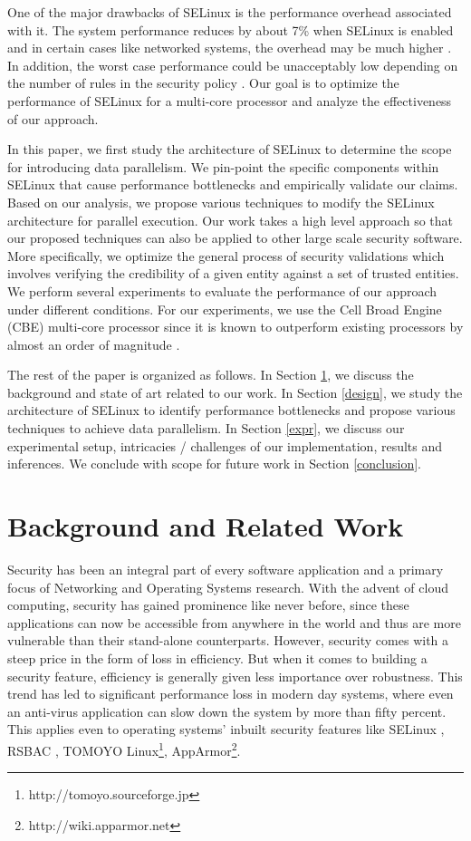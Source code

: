 \documentclass[conference]{IEEEtran}
\begin{document}
One of the major drawbacks of SELinux is the performance overhead associated with it. The system performance reduces by about 7\% when SELinux is enabled and in certain cases like networked systems, the
overhead may be much higher \cite{selinuxFAQ}. In addition, the worst
case performance could be unacceptably low depending on the number of
rules in the security policy \cite{report}. Our goal is to optimize the performance of SELinux for a multi-core processor and analyze the effectiveness of our approach.

In this paper, we first study the architecture of SELinux to determine
the scope for introducing data parallelism. We pin-point
the specific components within SELinux that cause performance
bottlenecks and empirically validate our claims. Based on our analysis, we propose various techniques
to modify the SELinux architecture for parallel
execution. Our work takes a high level approach so that our proposed techniques can also be applied to other large scale security software. More specifically, we optimize the general process of security validations which involves verifying the credibility of a given entity against a set of trusted entities. We
perform several experiments to evaluate the performance of our approach under different conditions. For our experiments, we use the Cell Broad Engine (CBE) multi-core processor since it is
known to outperform existing processors by almost an order of magnitude \cite{CBEArch}. 

The rest of the paper is organized as follows. In Section \ref{background}, we discuss the background and state of art related to our work. In Section \ref{design}, we
study the architecture of SELinux to identify performance bottlenecks and propose various techniques to
achieve data parallelism. In Section \ref{expr}, we discuss our experimental setup, intricacies / challenges of our implementation, results and inferences. We conclude with scope for future work in
Section \ref{conclusion}.

\section{Background and Related Work}\label{background}

Security has been an integral part of every software
application and a primary focus of Networking and Operating Systems research. 
With the advent of cloud computing,
security has gained prominence like never before, since these
applications can now be accessible from anywhere in the world and thus
are more vulnerable than their stand-alone counterparts. However,
security comes with a steep price in the form of loss in efficiency. But when it comes to building a security feature, efficiency is generally given less importance over robustness. This trend has led to significant performance loss in modern day systems, where even an
anti-virus application can slow down the system by more than fifty
percent. This applies even to operating systems' inbuilt security
features like SELinux \cite{s1}, RSBAC \cite{s2}, TOMOYO 
Linux\footnote{http://tomoyo.sourceforge.jp}, AppArmor\footnote{http://wiki.apparmor.net}.
\end{document}
